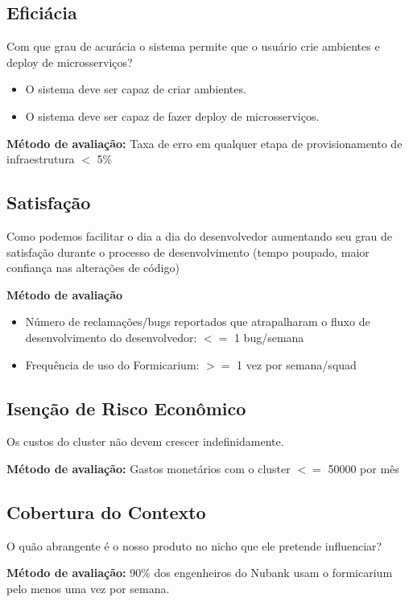 \documentclass[twosideprint]{politex}
\begin{document}
     \subsection{Eficiácia}
          Com que grau de acurácia o sistema permite que o usuário crie ambientes e deploy de microsserviços?
          \begin{itemize}
              \item O sistema deve ser capaz de criar ambientes.
              \item O sistema deve ser capaz de fazer deploy de microsserviços.
          \end{itemize}
          \textbf{Método de avaliação:}
              Taxa de erro em qualquer etapa de provisionamento de infraestrutura $<$ 5\%
     \subsection{Satisfação}
          Como podemos facilitar o dia a dia do desenvolvedor aumentando seu grau de satisfação durante o processo de desenvolvimento (tempo poupado, maior confiança nas alterações de código)\par
          \textbf{Método de avaliação}
          \begin{itemize}
              \item Número de reclamações/bugs reportados que atrapalharam o fluxo de desenvolvimento do desenvolvedor:  $<=$ 1 bug/semana
              \item Frequência de uso do Formicarium: $>=$ 1 vez por semana/squad
          \end{itemize}
     \subsection{Isenção de Risco Econômico}
          Os custos do cluster não devem crescer indefinidamente.\par
              \textbf{Método de avaliação:}
              Gastos monetários com o cluster $<=$ 50000 por mês\par
         \subsection{Cobertura do Contexto}
              O quão abrangente é o nosso produto no nicho que ele pretende influenciar?\par
              \textbf{Método de avaliação:} 
              90\% dos engenheiros do Nubank usam o formicarium pelo menos uma vez por semana.
\end{document}
